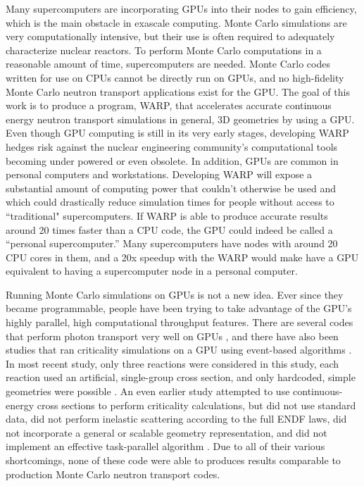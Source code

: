 Many supercomputers are incorporating GPUs into their nodes to gain efficiency, which is the main obstacle in exascale computing.  Monte Carlo simulations are very computationally intensive, but their use is often required to adequately characterize nuclear reactors.  To perform Monte Carlo computations in a reasonable amount of time, supercomputers are needed.  Monte Carlo codes written for use on CPUs cannot be directly run on GPUs, and no high-fidelity Monte Carlo neutron transport applications exist for the GPU.   The goal of this work is to produce a program, WARP, that accelerates accurate continuous energy neutron transport simulations in general, 3D geometries by using a GPU.  Even though GPU computing is still in its very early stages, developing WARP hedges risk against the nuclear engineering community's computational tools becoming under powered or even obsolete. In addition, GPUs are common in personal computers and workstations.  Developing WARP will expose a substantial amount of  computing power that couldn't otherwise be used and which could drastically reduce simulation times for people without access to ``traditional" supercomputers.  If WARP is able to produce accurate results around 20 times faster than a CPU code, the GPU could indeed be called a ``personal supercomputer.''   Many supercomputers have nodes with around 20 CPU cores in them, and a 20x speedup with the WARP would make have a GPU equivalent to having a supercomputer node in a personal computer.

Running Monte Carlo simulations on GPUs is not a new idea.  Ever since they became programmable, people have been trying to take advantage of the GPU's highly parallel, high computational throughput features.  There are several codes that perform photon transport very well on GPUs \cite{henderson,tianyu_arch}, and there have also been studies that ran criticality simulations on a GPU using event-based algorithms \cite{tianyu,tianyu_snamc,nelson}.  In most recent study, only three reactions were considered in this study, each reaction used an artificial, single-group cross section, and only hardcoded, simple geometries were possible \cite{tianyu,tianyu_snamc}.  An even earlier study attempted to use continuous-energy cross sections to perform criticality calculations, but did not use standard data, did not perform inelastic scattering according to the full ENDF laws, did not incorporate a general or scalable geometry representation, and did not implement an effective task-parallel algorithm \cite{nelson}.  Due to all of their various shortcomings, none of these code were able to produces results comparable to production Monte Carlo neutron transport codes.

